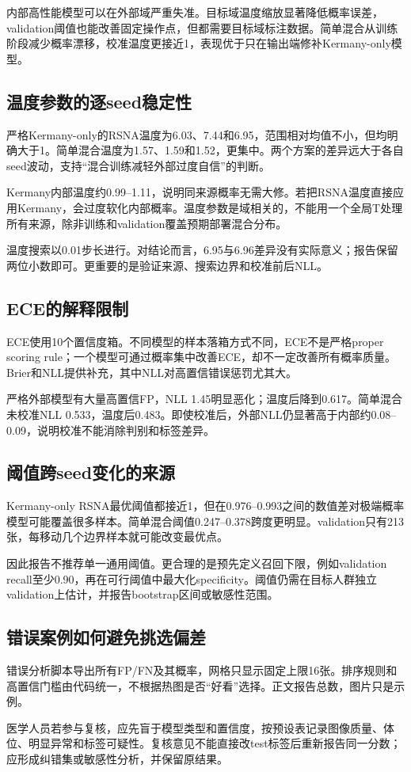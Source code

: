 内部高性能模型可以在外部域严重失准。目标域温度缩放显著降低概率误差，validation阈值也能改善固定操作点，但都需要目标域标注数据。简单混合从训练阶段减少概率漂移，校准温度更接近1，表现优于只在输出端修补Kermany-only模型。

\subsection{温度参数的逐seed稳定性}

严格Kermany-only的RSNA温度为6.03、7.44和6.95，范围相对均值不小，但均明确大于1。简单混合温度为1.57、1.59和1.52，更集中。两个方案的差异远大于各自seed波动，支持“混合训练减轻外部过度自信”的判断。

Kermany内部温度约0.99--1.11，说明同来源概率无需大修。若把RSNA温度直接应用Kermany，会过度软化内部概率。温度参数是域相关的，不能用一个全局T处理所有来源，除非训练和validation覆盖预期部署混合分布。

温度搜索以0.01步长进行。对结论而言，6.95与6.96差异没有实际意义；报告保留两位小数即可。更重要的是验证来源、搜索边界和校准前后NLL。

\subsection{ECE的解释限制}

ECE使用10个置信度箱。不同模型的样本落箱方式不同，ECE不是严格proper scoring rule；一个模型可通过概率集中改善ECE，却不一定改善所有概率质量。Brier和NLL提供补充，其中NLL对高置信错误惩罚尤其大。

严格外部模型有大量高置信FP，NLL 1.45明显恶化；温度后降到0.617。简单混合未校准NLL 0.533，温度后0.483。即使校准后，外部NLL仍显著高于内部约0.08--0.09，说明校准不能消除判别和标签差异。

\subsection{阈值跨seed变化的来源}

Kermany-only RSNA最优阈值都接近1，但在0.976--0.993之间的数值差对极端概率模型可能覆盖很多样本。简单混合阈值0.247--0.378跨度更明显。validation只有213张，每移动几个边界样本就可能改变最优点。

因此报告不推荐单一通用阈值。更合理的是预先定义召回下限，例如validation recall至少0.90，再在可行阈值中最大化specificity。阈值仍需在目标人群独立validation上估计，并报告bootstrap区间或敏感性范围。

\subsection{错误案例如何避免挑选偏差}

错误分析脚本导出所有FP/FN及其概率，网格只显示固定上限16张。排序规则和高置信门槛由代码统一，不根据热图是否“好看”选择。正文报告总数，图片只是示例。

医学人员若参与复核，应先盲于模型类型和置信度，按预设表记录图像质量、体位、明显异常和标签可疑性。复核意见不能直接改test标签后重新报告同一分数；应形成纠错集或敏感性分析，并保留原结果。
